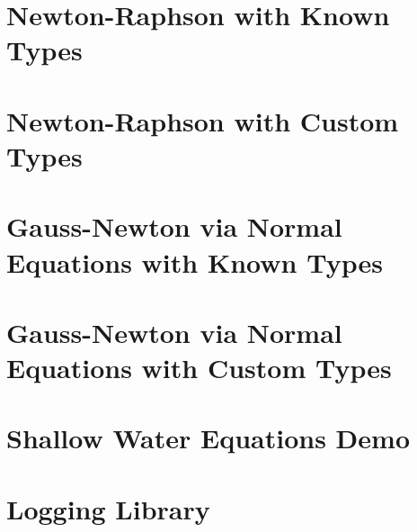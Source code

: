 \let\mypdfximage\pdfximage\def\pdfximage{\immediate\mypdfximage}\documentclass[twoside]{book}
\newcommand{\+}{\discretionary{\mbox{\scriptsize$\hookleftarrow$}}{}{}}
\newcommand{\clearemptydoublepage}{%
  \newpage{\pagestyle{empty}\cleardoublepage}%
}
\begin{document}
\chapter{Newton-\/\+Raphson with Known Types}
\label{md_pages_solvers_nonlinear_tutorial_1}

\chapter{Newton-\/\+Raphson with Custom Types}
\label{md_pages_solvers_nonlinear_tutorial_2}

\chapter{Gauss-\/\+Newton via Normal Equations with Known Types}
\label{md_pages_solvers_nonlinear_tutorial_3}

\chapter{Gauss-\/\+Newton via Normal Equations with Custom Types}
\label{md_pages_solvers_nonlinear_tutorial_4}

\chapter{Shallow Water Equations Demo}
\label{md_pages_swe_main}

\chapter{Logging Library}
\label{md_pages_utils_logger}


\backmatter
\newpage
{}
\clearemptydoublepage
{}
\printindex
\end{document}
